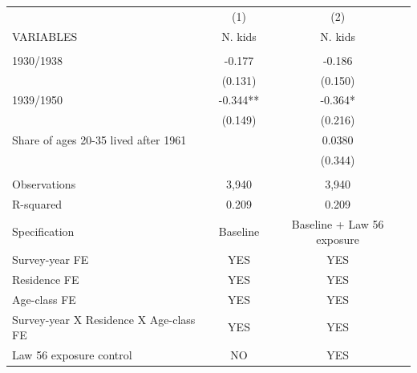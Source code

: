 \begin{tabular}{lcc} \hline
 & (1) & (2) \\
VARIABLES & N. kids & N. kids \\ \hline
 &  &  \\
1930/1938 & -0.177 & -0.186 \\
 & (0.131) & (0.150) \\
1939/1950 & -0.344** & -0.364* \\
 & (0.149) & (0.216) \\
Share of ages 20-35 lived after 1961 &  & 0.0380 \\
 &  & (0.344) \\
 &  &  \\
Observations & 3,940 & 3,940 \\
R-squared & 0.209 & 0.209 \\
Specification & Baseline & Baseline + Law 56 exposure \\
Survey-year FE & YES & YES \\
Residence FE & YES & YES \\
Age-class FE & YES & YES \\
Survey-year X Residence X Age-class FE & YES & YES \\
 Law 56 exposure control & NO & YES \\ \hline
\end{tabular}
